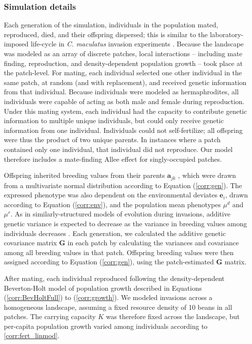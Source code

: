 \subsubsection{Simulation details }
Each generation of the simulation, individuals in the population mated, reproduced, died, and their offspring dispersed; this is similar to the laboratory-imposed life-cycle in \textit{C. maculatus} invasion experiments \citep{miller_sex_2013,wagner_genetic_2016,ochocki_rapid_2017}. Because the landscape was modeled as an array of discrete patches, local interactions -- including mate finding, reproduction, and density-dependent population growth -- took place at the patch-level.
For mating, each individual selected one other individual in the same patch, at random (and with replacement), and received genetic information from that individual. Because individuals were modeled as hermaphrodites, all individuals were capable of acting as both male and female during reproduction. Under this mating system, each individual had the capacity to contribute genetic information to multiple unique individuals, but could only receive genetic information from one individual. Individuals could not self-fertilize; all offspring were thus the product of two unique parents. In instances where a patch contained only one individual, that individual did not reproduce. Our model therefore includes a mate-finding Allee effect for singly-occupied patches.

Offspring inherited breeding values from their parents $\bm{a}_{jk}$ , which were drawn from a multivariate normal distribution according to Equation (\ref{corr:gen}). The expressed phenotype was also dependent on the environmental deviates $\bm{e}_{i}$, drawn according to Equation (\ref{corr:env}), and the population mean phenotypes $\mu^{d}$ and $\mu^{r}$. As in similarly-structured models of evolution during invasions, additive genetic variance is expected to decrease as the variance in breeding values among individuals decreases \citep{phillips_evolutionary_2015}. Each generation, we calculated the additive genetic covariance matrix $\bm{G}$ in each patch by calculating the variances and covariance among all breeding values in that patch. Offspring breeding values were then assigned according to Equation (\ref{corr:gen}), using the patch-estimated $\bm{G}$ matrix.

After mating, each individual reproduced following the density-dependent Beverton-Holt model of population growth described in Equations (\ref{corr:BevHoltFull}) to (\ref{corr:growth}). We modeled invasions across a homogeneous landscape, assuming a fixed resource density of 10 beans in all patches. The carrying capacity $K$ was therefore fixed across the landscape, but per-capita population growth varied among individuals according to \ref{corr:fert_linmod}.

